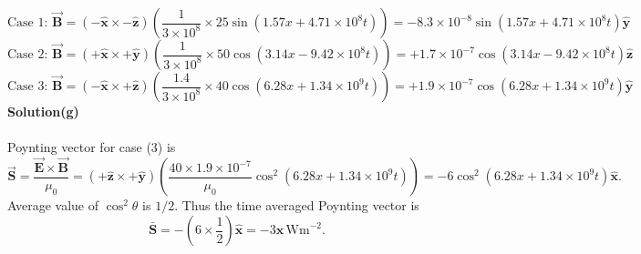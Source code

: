 \documentclass{article}
\begin{document}
\[\text{Case 1: }\boldsymbol{\vec{B}}=(-\boldsymbol{\hat{x}}\times-\boldsymbol{\hat{z}})\left(\frac{1}{3\times10^8}\times25\sin(1.57x+4.71\times10^8t)\right)=-8.3\times10^{-8}\sin(1.57x+4.71\times10^8t)\boldsymbol{\hat{y}}\]
\[\text{Case 2: }\boldsymbol{\vec{B}}=(+\boldsymbol{\hat{x}}\times+\boldsymbol{\hat{y}})\left(\frac{1}{3\times10^8}\times50\cos(3.14x-9.42\times10^8t)\right)=+1.7\times10^{-7}\cos(3.14x-9.42\times10^8t)\boldsymbol{\hat{z}}\]
\[\text{Case 3: }\boldsymbol{\vec{B}}=(-\boldsymbol{\hat{x}}\times+\boldsymbol{\hat{z}})\left(\frac{1.4}{3\times10^8}\times40\cos(6.28x+1.34\times10^9t)\right)=+1.9\times10^{-7}\cos(6.28x+1.34\times10^9t)\boldsymbol{\hat{y}}\]
\textbf{Solution(g)}
\\
\\Poynting vector for case (3) is 
\[\boldsymbol{\vec{S}}=\frac{\boldsymbol{\vec{E}}\times\boldsymbol{\vec{B}}}{\mu_0}=(+\boldsymbol{\hat{z}}\times+\boldsymbol{\hat{y}})\left(\frac{40\times1.9\times10^{-7}}{\mu_0}\cos^2(6.28x+1.34\times10^9t)\right)=-6\cos^2(6.28x+1.34\times10^9t)\boldsymbol{\hat{x}}.\]
Average value of $\cos^2\theta$ is $1/2$. Thus the time averaged Poynting vector is
\[\bar{\boldsymbol{S}}=-\left(6\times\frac{1}{2}\right)\boldsymbol{\hat{x}}=-3\boldsymbol{\hat{x}}\,\text{Wm}^{-2}.\]
\end{document}
